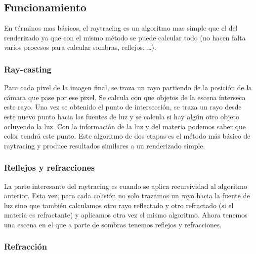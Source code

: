\begin{pregunta}


\subsection*{Funcionamiento}

En términos mas básicos, el raytracing es un algoritmo mas simple que el del
renderizado ya que con el mismo método se puede calcular todo (no hacen falta
varios procesos para calcular sombras, reflejos, \dots). \cite{leopold_english_2017}

\subsubsection*{Ray-casting}

Para cada pixel de la imagen final, se traza un rayo partiendo de la posición de
la cámara que pase por ese pixel. Se calcula con que objetos de la escena ínterseca
este rayo. Una vez se obtenido el punto de intersección, se traza un rayo desde
este nuevo punto hacia las fuentes de luz y se calcula si hay algún otro objeto
ocluyendo la luz. Con la información de la luz y del materia podemos saber que
color tendrá este punto. Este algoritmo de dos etapas es el método más básico de
raytracing y produce resultados similares a un renderizado simple.

\subsubsection*{Reflejos y refracciones}

La parte interesante del raytracing es cuando se aplica recursividad al
algoritmo anterior. Esta vez, para cada colisión no solo trazamos un rayo hacia
la fuente de luz sino que también calculamos otro rayo reflectado y otro
refractado (si el materia es refractante) y aplicamos otra vez el mismo
algoritmo. Ahora tenemos una escena en el que a parte de sombras tenemos
reflejos y refracciones.

\subsubsection*{Refracción}


\end{pregunta}
